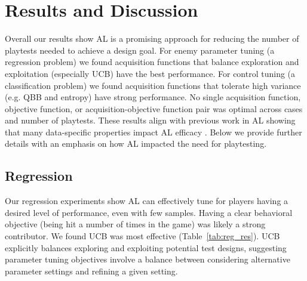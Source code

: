 \documentclass{sig-alternate}
\begin{document}




\section{Results and Discussion}

Overall our results show AL is a promising approach for reducing the number of playtests needed to achieve a design goal.
For enemy parameter tuning (a regression problem) we found acquisition functions that balance exploration and exploitation (especially UCB) have the best performance.
For control tuning (a classification problem) we found acquisition functions that tolerate high variance (e.g. QBB and entropy) have strong performance.
No single acquisition function, objective function, or acquisition-objective function pair was optimal across cases and number of playtests.
These results align with previous work in AL showing that many data-specific properties impact AL efficacy \cite{schein2007:al-logreg-eval}.
Below we provide further details with an emphasis on how AL impacted the need for playtesting.


\subsection{Regression}

Our regression experiments show AL can effectively tune for players having a desired level of performance, even with few samples.
Having a clear behavioral objective (being hit a number of times in the game) was likely a strong contributor.
We found UCB was most effective (Table~\ref{tab:reg_res}).
UCB explicitly balances exploring and exploiting potential test designs, suggesting parameter tuning objectives involve a balance between considering alternative parameter settings and refining a given setting.
\end{document}
